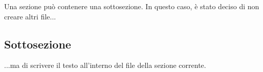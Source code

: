 Una sezione può contenere una sottosezione. In questo caso, è stato deciso di non creare altri file...

\subsection{Sottosezione}
...ma di scrivere il testo all'interno del file della sezione corrente.